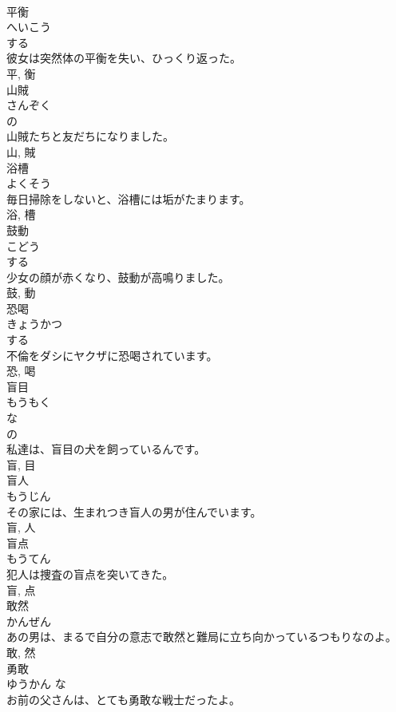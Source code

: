 \documentclass[8pt]{extreport}
\begin{document}
\begin{CJK}{UTF8}{min}
\\	平衡	
\\	へいこう	
\\	する 
\\	彼女は突然体の平衡を失い、ひっくり返った。	
\\	平, 衡	
\\	山賊	
\\	さんぞく	
\\	の 
\\	山賊たちと友だちになりました。	
\\	山, 賊	
\\	浴槽	
\\	よくそう	
\\	毎日掃除をしないと、浴槽には垢がたまります。	
\\	浴, 槽	
\\	鼓動	
\\	こどう	
\\	する 
\\	少女の顔が赤くなり、鼓動が高鳴りました。	
\\	鼓, 動	
\\	恐喝	
\\	きょうかつ	
\\	する 
\\	不倫をダシにヤクザに恐喝されています。	
\\	恐, 喝	
\\	盲目	
\\	もうもく	
\\	な 
\\	の 
\\	私達は、盲目の犬を飼っているんです。	
\\	盲, 目	
\\	盲人	
\\	もうじん	
\\	その家には、生まれつき盲人の男が住んでいます。	
\\	盲, 人	
\\	盲点	
\\	もうてん	
\\	犯人は捜査の盲点を突いてきた。	
\\	盲, 点	
\\	敢然	
\\	かんぜん	
\\	あの男は、まるで自分の意志で敢然と難局に立ち向かっているつもりなのよ。	
\\	敢, 然	
\\	勇敢	
\\	ゆうかん	な 
\\	お前の父さんは、とても勇敢な戦士だったよ。	

\end{CJK}
\end{document}
